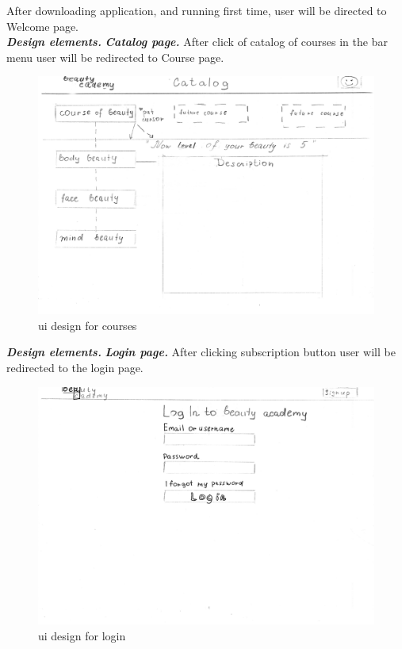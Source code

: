 \documentclass{scrartcl}
\begin{document}
After downloading application, and running first time, user will be directed to Welcome page.\\

\textbf{\textit{Design elements.}}
\textbf{\textit{Catalog page.}}
After click of catalog of courses in the bar menu user will be redirected to Course page.

\begin{figure}[H]
\centering
\includegraphics[width = 140mm]{proto-foto/ui-courses.JPG}
\caption{ui design for courses}
\label{welcome page}
\end{figure}

\textbf{\textit{Design elements.}}
\textbf{\textit{Login page. }}
After clicking subscription button user will be redirected to the login page.
\begin{figure}[H]
\centering
\includegraphics[width = 140mm]{proto-foto/ui-login.JPG}
\caption{ui design for login}
\label{login page}
\end{figure}
\end{document}
